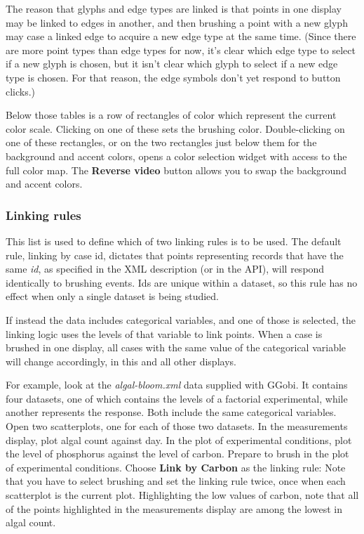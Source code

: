 \documentclass[11pt]{article}
\def\Widget#1{\textbf{#1}}
\def\File#1{\textsl{#1}}
\begin{document}
The reason that glyphs and edge types are linked is that points in one
display may be linked to edges in another, and then brushing a point
with a new glyph may case a linked edge to acquire a new edge type at
the same time.  (Since there are more point types than edge types for
now, it's clear which edge type to select if a new glyph is chosen,
but it isn't clear which glyph to select if a new edge type is chosen.
For that reason, the edge symbols don't yet respond to button clicks.)

Below those tables is a row of rectangles of color which represent the
current color scale.  Clicking on one of these sets the brushing
color.  Double-clicking on one of these rectangles, or on the two
rectangles just below them for the background and accent colors, opens
a color selection widget with access to the full color map.  The
\Widget{Reverse video} button allows you to swap the background and
accent colors.

\subsubsection{Linking rules}
\label{LinkingRules}

This list is used to define which of two linking rules is
to be used.  The default rule, linking by case id, dictates that points
representing records that have the same {\it id}, as specified in the
XML description (or in the API), will respond identically to brushing
events.  Ids are unique within a dataset, so this rule has no effect
when only a single dataset is being studied.

If instead the data includes categorical variables, and one of those
is selected, the linking logic uses the levels of that variable to
link points.  When a case is brushed in one display, all cases
with the same value of the categorical variable will change
accordingly, in this and all other displays.

For example, look at the \File{algal-bloom.xml} data supplied with
GGobi.  It contains four datasets, one of which contains the levels of
a factorial experimental, while another represents the response.  Both
include the same categorical variables.  Open two scatterplots, one
for each of those two datasets.  In the measurements display, plot
algal count against day.  In the plot of experimental conditions, plot
the level of phosphorus against the level of carbon.  Prepare to brush
in the plot of experimental conditions.  Choose \Widget{Link by Carbon}
as the linking rule: Note that you have to select brushing and set the
linking rule twice, once when each scatterplot is the current plot.
Highlighting the low values of carbon, note that all of the points
highlighted in the measurements display are among the lowest in algal
count.
\end{document}
